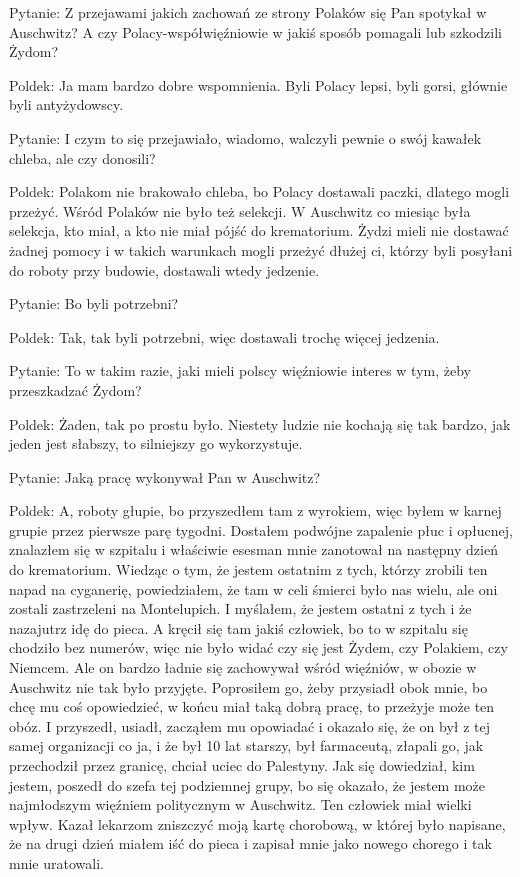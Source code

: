 Pytanie: Z przejawami jakich zachowań ze strony Polaków się Pan spotykał w Auschwitz? A czy Polacy-współwięźniowie w jakiś sposób pomagali lub szkodzili Żydom? 

Poldek: Ja mam bardzo dobre wspomnienia. Byli Polacy lepsi, byli gorsi, głównie byli antyżydowscy. 

Pytanie: I czym to się przejawiało, wiadomo, walczyli pewnie o swój kawałek chleba, ale czy donosili?  

Poldek: Polakom nie brakowało chleba, bo Polacy dostawali paczki, dlatego mogli przeżyć. Wśród Polaków nie było też selekcji. W Auschwitz co miesiąc była selekcja, kto miał, a kto nie miał pójść do krematorium. Żydzi mieli nie dostawać żadnej pomocy i w takich warunkach mogli przeżyć dłużej ci, którzy byli posyłani do roboty przy budowie, dostawali wtedy jedzenie. 

Pytanie: Bo byli potrzebni? 

Poldek: Tak, tak byli potrzebni, więc dostawali trochę więcej jedzenia. 

Pytanie: To w takim razie, jaki mieli polscy więźniowie interes w tym, żeby przeszkadzać Żydom? 

Poldek: Żaden, tak po prostu było. Niestety ludzie nie kochają się tak bardzo, jak jeden jest słabszy, to silniejszy go wykorzystuje. 

Pytanie: Jaką pracę wykonywał Pan w Auschwitz? 

Poldek: A, roboty głupie, bo przyszedłem tam z wyrokiem, więc byłem w karnej grupie przez pierwsze parę tygodni. Dostałem podwójne zapalenie płuc i opłucnej, znalazłem się w szpitalu i właściwie esesman mnie zanotował na następny dzień do krematorium. Wiedząc o tym, że jestem ostatnim z tych, którzy zrobili ten napad na cyganerię, powiedziałem, że tam w celi śmierci było nas wielu, ale oni zostali zastrzeleni na Montelupich. I myślałem, że jestem ostatni z tych i że nazajutrz idę do pieca. A kręcił się tam jakiś człowiek, bo to w szpitalu się chodziło bez numerów, więc nie było widać czy się jest Żydem, czy Polakiem, czy Niemcem. Ale on bardzo ładnie się zachowywał wśród więźniów, w obozie w Auschwitz nie tak było przyjęte. Poprosiłem go, żeby przysiadł obok mnie, bo chcę mu coś opowiedzieć, w końcu miał taką dobrą pracę, to przeżyje może ten obóz. I przyszedł, usiadł, zacząłem mu opowiadać i okazało się, że on był z tej samej organizacji co ja, i że był 10 lat starszy, był farmaceutą, złapali go, jak przechodził przez granicę, chciał uciec do Palestyny. Jak się dowiedział, kim jestem, poszedł do szefa tej podziemnej grupy, bo się okazało, że jestem może najmłodszym więźniem politycznym w Auschwitz. Ten człowiek miał wielki wpływ. Kazał lekarzom zniszczyć moją kartę chorobową, w której było napisane, że na drugi dzień miałem iść do pieca i zapisał mnie jako nowego chorego i tak mnie uratowali.  

